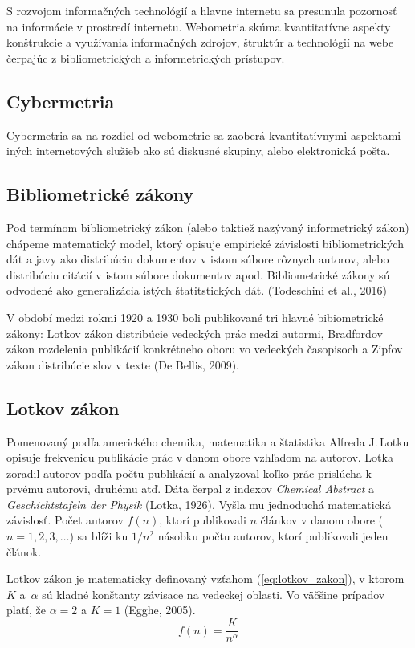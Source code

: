 S rozvojom informačných technológií a hlavne internetu sa presunula pozornosť na
informácie v prostredí internetu.  Webometria skúma kvantitatívne aspekty
konštrukcie a využívania informačných zdrojov, štruktúr a technológií na webe
čerpajúc z bibliometrických a informetrických prístupov.


\subsection{Cybermetria}

Cybermetria sa na rozdiel od webometrie sa zaoberá kvantitatívnymi aspektami
iných internetových služieb ako sú diskusné skupiny, alebo elektronická pošta.


\subsection{Bibliometrické zákony}

Pod termínom bibliometrický zákon (alebo taktiež nazývaný informetrický zákon)
chápeme matematický model, ktorý opisuje empirické závislosti bibliometrických
dát a javy ako distribúciu dokumentov v istom súbore rôznych autorov, alebo
distribúciu citácií v istom súbore dokumentov apod.  Bibliometrické zákony sú
odvodené ako generalizácia istých štatitstických dát.  (Todeschini et al., 2016)

V období medzi rokmi 1920 a 1930 boli publikované tri hlavné bibiometrické
zákony: Lotkov zákon distribúcie vedeckých prác medzi autormi, Bradfordov zákon
rozdelenia publikácií konkrétneho oboru vo vedeckých časopisoch a Zipfov zákon
distribúcie slov v texte (De Bellis, 2009).


\subsection{Lotkov zákon}

Pomenovaný podľa amerického chemika, matematika a štatistika Alfreda J.\,Lotku
opisuje frekvenicu publikácie prác v danom obore vzhľadom na autorov.  Lotka
zoradil autorov podľa počtu publikácií a analyzoval koľko prác prislúcha k
prvému autorovi, druhému atď.  Dáta čerpal z indexov \emph{Chemical Abstract} a
\emph{Geschichtstafeln der Physik} (Lotka, 1926).  Vyšla mu jednoduchá
matematická závislosť.  Počet autorov $f(n)$, ktorí publikovali $n$ článkov v
danom obore ($n = 1, 2, 3, \dots$) sa blíži ku $1/n^2$ násobku počtu autorov,
ktorí publikovali jeden článok.

Lotkov zákon je matematicky definovaný vzťahom (\ref{eq:lotkov_zakon}), v ktorom
$K$ a~$\alpha$ sú kladné konštanty závisace na vedeckej oblasti.  Vo väčšine
prípadov platí, že $\alpha = 2$ a $K = 1$ (Egghe, 2005).
\begin{equation}
\label{eq:lotkov_zakon}
f(n) = \frac{K}{n^\alpha}
\end{equation}

